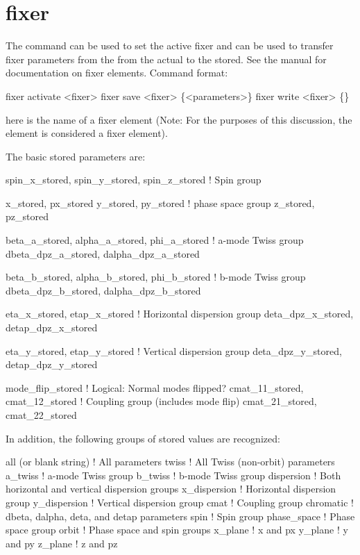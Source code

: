 \section{fixer}
\label{s:fixer}

The  command can be used to set the active fixer and can be used to transfer fixer
parameters from the from the actual to the stored. See the \bmad manual for documentation
on fixer elements. Command format:
\begin{example}
  fixer activate <fixer>
  fixer save <fixer> \{<parameters>\}
  fixer write <fixer> \{<file-name>\}
\end{example}
here  is the name of a fixer element (Note: For the purposes of this discussion, the
 element is considered a fixer element).

The basic stored parameters are:
\begin{example}
  spin_x_stored, spin_y_stored, spin_z_stored     ! Spin group

  x_stored, px_stored
  y_stored, py_stored                             ! phase space group
  z_stored, pz_stored

  beta_a_stored, alpha_a_stored, phi_a_stored     ! a-mode Twiss group
  dbeta_dpz_a_stored, dalpha_dpz_a_stored

  beta_b_stored, alpha_b_stored, phi_b_stored     ! b-mode Twiss group
  dbeta_dpz_b_stored, dalpha_dpz_b_stored

  eta_x_stored, etap_x_stored                     ! Horizontal dispersion group
  deta_dpz_x_stored, detap_dpz_x_stored

  eta_y_stored, etap_y_stored                     ! Vertical dispersion group
  deta_dpz_y_stored, detap_dpz_y_stored

  mode_flip_stored                                ! Logical: Normal modes flipped? 
  cmat_11_stored, cmat_12_stored                  ! Coupling group (includes mode flip)
  cmat_21_stored, cmat_22_stored
\end{example}

In addition, the following groups of stored values are recognized:
\begin{example}
  all (or blank string)   ! All parameters
  twiss                   ! All Twiss (non-orbit) parameters
  a_twiss                 ! a-mode Twiss group
  b_twiss                 ! b-mode Twiss group
  dispersion              ! Both horizontal and vertical dispersion groups
  x_dispersion            ! Horizontal dispersion group
  y_dispersion            ! Vertical dispersion group
  cmat                    ! Coupling group
  chromatic               ! dbeta, dalpha, deta, and detap parameters
  spin                    ! Spin group
  phase_space             ! Phase space group
  orbit                   ! Phase space and spin groups
  x_plane                 ! x and px
  y_plane                 ! y and py
  z_plane                 ! z and pz
\end{example}

